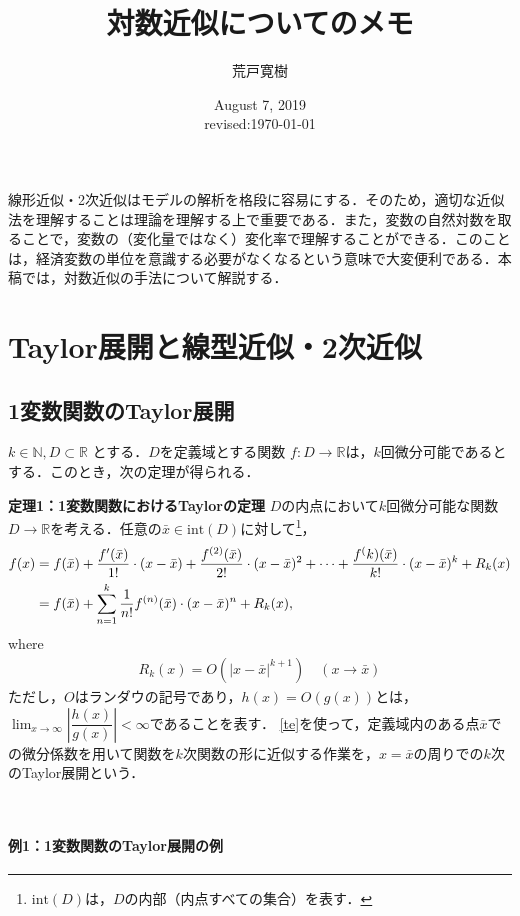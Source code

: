 \documentclass[a4paper,12pt,onecolumn,oneside,notitlepage,final]{article}
\title{対数近似についてのメモ
}
\author{荒戸寛樹}
\date{August 7, 2019 \\ revised:\today}
\begin{document}
\maketitle

線形近似・2次近似はモデルの解析を格段に容易にする．そのため，適切な近似法を理解することは理論を理解する上で重要である．また，変数の自然対数を取ることで，変数の（変化量ではなく）変化率で理解することができる．このことは，経済変数の単位を意識する必要がなくなるという意味で大変便利である．本稿では，対数近似の手法について解説する．

\section{Taylor展開と線型近似・2次近似}
\subsection{1変数関数のTaylor展開}
$k \in \mathbb{N}, D \subset \mathbb{R}$ とする．$D$を定義域とする関数 $f: D \to \mathbb{R}$は，$k$回微分可能であるとする．このとき，次の定理が得られる．\\

\begin{itembox}[l]{{\bf 定理1：1変数関数におけるTaylorの定理}}
$D$の内点において$k$回微分可能な関数$D\to\mathbb{R}$を考える．任意の$\bar{x} \in \text{int}(D)$に対して\footnote{$\text{int}(D)$は，$D$の内部（内点すべての集合）を表す．}，
\begin{align}
f(x) &= f(\bar{x}) + \frac{f^\prime(\bar{x})}{1!} \cdot (x-\bar x) + \frac{f^{(2)}(\bar{x})}{2!} \cdot (x-\bar x)^2 + \cdots + \frac{f^(k)(\bar x)}{k!}\cdot (x-\bar x)^k + R_k(x) \notag\\
&= f(\bar x) + \sum_{n=1}^k \frac{1}{n!} f^{(n)}(\bar x) \cdot (x - \bar x)^n + R_k(x), \label{te}
\end{align}
where
\begin{align*}
R_k(x) = O(|x-\bar x|^{k+1}) \quad (x \to \bar x)
\end{align*}
ただし，$O$はランダウの記号であり，$h(x) = O(g(x))$とは，$\lim_{x\to\infty}\left|\dfrac{h(x)}{g(x)}\right| < \infty$であることを表す．
\eqref{te}を使って，定義域内のある点$\bar x$での微分係数を用いて関数を$k$次関数の形に近似する作業を，$x = \bar x$の周りでの$k$次のTaylor展開という．
\end{itembox}\\

\paragraph{例1：1変数関数のTaylor展開の例}
\end{document}
